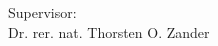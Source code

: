 \cleardoublepage
\thispagestyle{empty}

\null\vfill

\noindent Supervisor: \\

\noindent Dr. rer. nat. Thorsten O. Zander

\vspace{6.05cm}

\clearpage